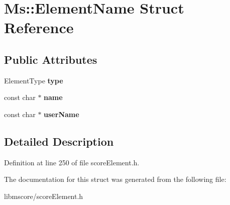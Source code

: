 \hypertarget{struct_ms_1_1_element_name}{}\section{Ms\+:\+:Element\+Name Struct Reference}
\label{struct_ms_1_1_element_name}
\subsection*{Public Attributes}
\begin{DoxyCompactItemize}
\item 
\mbox{\label{struct_ms_1_1_element_name_ac08dc14105b881350e858c54b7754c12}} 
Element\+Type {\bfseries type}
\item 
\mbox{\label{struct_ms_1_1_element_name_af810b4bcec6a20f762a36605034146f2}} 
const char $\ast$ {\bfseries name}
\item 
\mbox{\label{struct_ms_1_1_element_name_aaa1f4a2d79c87e44004f2a1da834f40d}} 
const char $\ast$ {\bfseries user\+Name}
\end{DoxyCompactItemize}


\subsection{Detailed Description}


Definition at line 250 of file score\+Element.\+h.



The documentation for this struct was generated from the following file\+:\begin{DoxyCompactItemize}
\item 
libmscore/score\+Element.\+h\end{DoxyCompactItemize}
